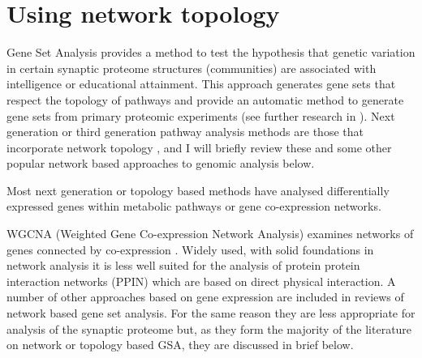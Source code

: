 \section{Using network topology}
\label{sec: using network topology}

Gene Set Analysis provides a method to test the hypothesis that genetic variation in certain synaptic proteome structures (communities) are associated with intelligence or educational attainment. This approach generates gene sets that respect the topology of pathways and provide an automatic method to generate gene sets from primary proteomic experiments (see further research in \cite{lamparter2016fast}). Next generation or third generation pathway analysis methods are those that incorporate network topology \cite{khatri2012ten},\cite{zyla2017ranking} and I will briefly review these and some other popular network based approaches to genomic analysis below.

Most next generation or topology based methods have analysed differentially expressed genes within metabolic pathways or gene co-expression networks.  



WGCNA (Weighted Gene Co-expression Network Analysis) examines networks of genes connected by co-expression \cite{langfelder2008wgcna}. Widely used, with solid foundations in network analysis it is less well suited for the analysis of protein protein interaction networks (PPIN) which are based on direct physical interaction. A number of other approaches based on gene expression are included in reviews of network based gene set analysis. For the same reason they are less appropriate for analysis of the synaptic proteome but, as they form the majority of the literature on network or topology based GSA, they are discussed in brief below.


